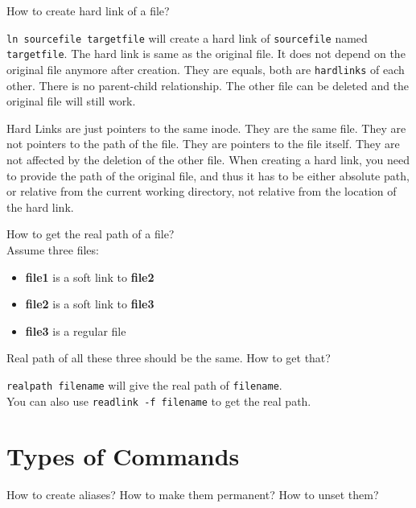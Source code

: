 \begin{qs}
  How to create hard link of a file?
\end{qs}

\begin{ans}
  \texttt{ln sourcefile targetfile} will create a hard link of \texttt{sourcefile}
  named \texttt{targetfile}. The hard link is same as the original file. It does
  not depend on the original file anymore after creation. They are equals,
  both are \texttt{hardlinks} of each other. There is no parent-child relationship.
  The other file can be deleted and the original file will still work.
\end{ans}

\begin{definition}
  Hard Links are just pointers to the same inode. They are the same file.
  They are not pointers to the path of the file. They are pointers to the
  file itself. They are not affected by the deletion of the other file.
  When creating a hard link, you need to provide the path of the original
  file, and thus it has to be either absolute path, or relative from the
  current working directory, not relative from the location of the hard link.
\end{definition}

\begin{qs}
  How to get the real path of a file?\\
  Assume three files:
  \begin{itemize}
    \item \textbf{file1} is a soft link to \textbf{file2}
    \item \textbf{file2} is a soft link to \textbf{file3}
    \item \textbf{file3} is a regular file
  \end{itemize}
  Real path of all these three should be the same. How to get that?
\end{qs}

\begin{ans}
  \texttt{realpath filename} will give the real path of \texttt{filename}. \\
  You can also use \texttt{readlink -f filename} to get the real path.
\end{ans}

\section{Types of Commands}

\begin{qs}
  How to create aliases? How to make them permanent? How to unset them?
\end{qs}

